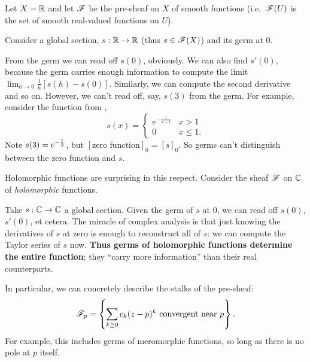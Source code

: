 \begin{example}
	Let $X = \mathbb R$ and let $\mathscr F$ be the pre-sheaf on $X$ of smooth functions
	(i.e.\ $\mathscr F(U)$ is the set of smooth real-valued functions on $U$).

	Consider a global section, $s : \mathbb R \to \mathbb R$ (thus $s \in \mathscr F(X)$)
	and its germ at $0$.
	\begin{enumerate}[(a)]
		\ii From the germ we can read off $s(0)$, obviously.
		\ii We can also find $s'(0)$, because the germ carries enough
		information to compute the limit $\lim_{h \to 0} \frac1h[s(h)-s(0)]$.
		\ii Similarly, we can compute the second derivative and so on.
		\ii However, we can't read off, say, $s(3)$ from the germ.
		For example, consider the function from ,
		\[
			s(x) = \begin{cases}
				e^{-\frac{1}{x-1}} & x > 1 \\
				0 & x \le 1.
			\end{cases}
		\]
		Note $s(3) = e^{-\frac{1}{2}}$, but $[\text{zero function}]_0 = [s]_0$.
		So germs can't distinguish between the zero function and $s$.
	\end{enumerate}
\end{example}

\begin{example}
	Holomorphic functions are surprising in this respect.
	Consider the sheaf $\mathscr F$ on $\mathbb C$ of \emph{holomorphic} functions.

	Take $s : \mathbb C \to \mathbb C$ a global section.
	Given the germ of $s$ at $0$, we can read off $s(0)$, $s'(0)$, et cetera.
	The miracle of complex analysis is that just knowing
	the derivatives of $s$ at zero is enough to reconstruct all of $s$:
	we can compute the Taylor series of $s$ now.
	\textbf{Thus germs of holomorphic functions determine the entire function};
	they ``carry more information'' than their real counterparts.
	
	In particular, we can concretely describe the stalks of the pre-sheaf:
	\[
		\mathscr F_p = \left\{
			\sum_{k \ge 0} c_k (z-p)^k
			\text{ convergent near $p$}
		\right\}.
	\]
	For example, this includes germs of meromorphic functions,
	so long as there is no pole at $p$ itself.
\end{example}

